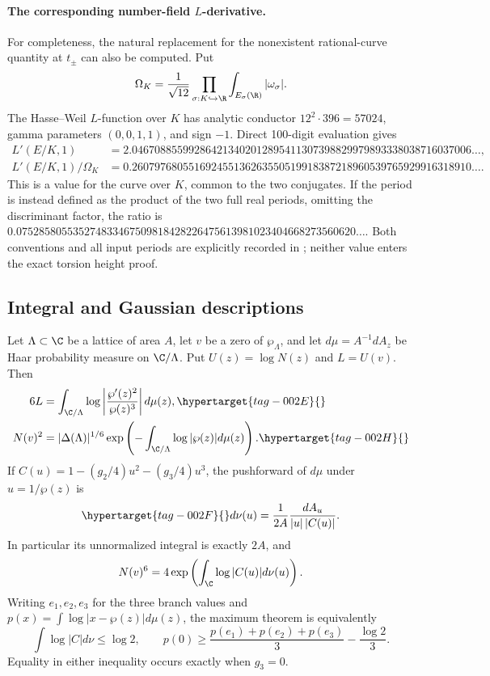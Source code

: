 \paragraph{The corresponding number-field $L$-derivative.}
For completeness, the natural replacement for the nonexistent
rational-curve quantity at $t_\pm$ can also be computed. Put
\[
 \Omega_K=\frac1{\sqrt{12}}
  \prod_{\sigma:K\hookrightarrow\R}
       \int_{E_\sigma(\R)}|\omega_\sigma|.
\]
The Hasse--Weil $L$-function over $K$ has analytic conductor
$12^2\cdot396=57024$, gamma parameters $(0,0,1,1)$, and sign
$-1$. Direct 100-digit evaluation gives
\begin{align*}
 L'(E/K,1)&=2.046708855992864213402012895411307398829979893338038716037006\ldots,\\
 L'(E/K,1)/\Omega_K
 &=0.260797680551692455136263550519918387218960539765929916318910\ldots.
\end{align*}
This is a value for the curve over $K$, common to the two
conjugates. If the period is instead defined as the product of
the two full real periods, omitting the discriminant factor,
the ratio is
$0.075285805535274833467509818428226475613981023404668273560620\ldots$.
Both conventions and all input periods are explicitly recorded
in ; neither value enters
the exact torsion height proof.



\subsection{Integral and Gaussian descriptions}

\begin{proposition}\hypertarget{tag-001T}{}\label{ari:C.8.6}

Let $\Lambda\subset\C$ be a lattice of area $A$, let $v$ be a zero
of $\wp_\Lambda$, and let $d\mu=A^{-1}dA_z$ be Haar probability
measure on $\C/\Lambda$. Put $U(z)=\log N(z)$ and
$L=U(v)$. Then
\begin{align}
 6L&=\int_{\C/\Lambda}\log\left|\frac{\wp'(z)^2}{\wp(z)^3}\right|d\mu(z),
 \hypertarget{tag-002E}{}\label{ari:eq:ca-mahler}\\
 N(v)^2&=|\Delta(\Lambda)|^{1/6}
      \exp\left(-\int_{\C/\Lambda}\log|\wp(z)|d\mu(z)\right).
 \hypertarget{tag-002H}{}\label{ari:eq:ca-wpmean}
\end{align}
If $C(u)=1-(g_2/4)u^2-(g_3/4)u^3$, the pushforward of $d\mu$
under $u=1/\wp(z)$ is
\begin{equation}\hypertarget{tag-002F}{}\label{ari:eq:ca-nu}
 d\nu(u)=\frac1{2A}\frac{dA_u}{|u|\,|C(u)|}.
\end{equation}
In particular its unnormalized integral is exactly $2A$, and
\[
 N(v)^6=4\exp\left(\int_{\C}\log|C(u)|d\nu(u)\right).
\]
Writing $e_1,e_2,e_3$ for the three branch values and
$p(x)=\int\log|x-\wp(z)|d\mu(z)$, the maximum theorem is equivalently
\[
 \int\log|C|d\nu\leq\log2,\qquad
 p(0)\geq\frac{p(e_1)+p(e_2)+p(e_3)}3-\frac{\log2}3.
\]
Equality in either inequality occurs exactly when $g_3=0$.
\end{proposition}


